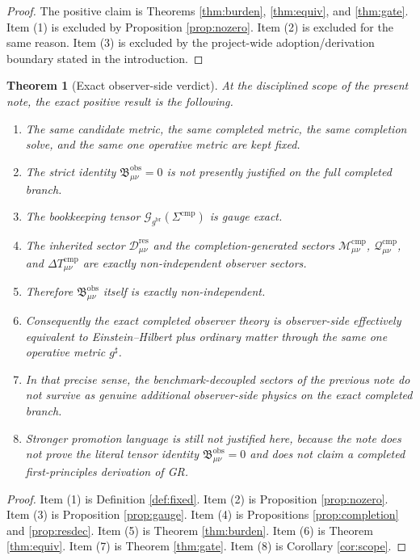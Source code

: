 \documentclass[11pt]{article}
\newcommand{\ObserverMetric}{g^{\mathrm{br}}}
\newcommand{\CompletedMetric}{g^{\sharp}}
\newcommand{\CompShift}{\Sigma^{\mathrm{cmp}}}
\newcommand{\ResidualDec}{\mathcal D_{\mu\nu}^{\mathrm{res}}}
\newcommand{\GaugeBook}{\mathcal G_{\ObserverMetric}}
\newcommand{\CompMix}{\mathcal M_{\mu\nu}^{\mathrm{cmp}}}
\newcommand{\CompQuad}{\mathcal Q_{\mu\nu}^{\mathrm{cmp}}}
\newcommand{\DeltaTComp}{\Delta T_{\mu\nu}^{\mathrm{cmp}}}
\newcommand{\ObsBurden}{\mathfrak B_{\mu\nu}^{\mathrm{obs}}}
\newtheorem{theorem}{Theorem}
\begin{document}
\begin{proof}
The positive claim is Theorems \ref{thm:burden}, \ref{thm:equiv}, and \ref{thm:gate}. Item (1) is excluded by Proposition \ref{prop:nozero}. Item (2) is excluded for the same reason. Item (3) is excluded by the project-wide adoption/derivation boundary stated in the introduction.
\end{proof}

\begin{theorem}[Exact observer-side verdict]
\label{thm:verdict}
At the disciplined scope of the present note, the exact positive result is the following.
\begin{enumerate}
    \item The same candidate metric, the same completed metric, the same completion solve, and the same one operative metric are kept fixed.
    \item The strict identity \(\ObsBurden=0\) is not presently justified on the full completed branch.
    \item The bookkeeping tensor \(\GaugeBook(\CompShift)\) is gauge exact.
    \item The inherited sector \(\ResidualDec\) and the completion-generated sectors \(\CompMix\), \(\CompQuad\), and \(\DeltaTComp\) are exactly non-independent observer sectors.
    \item Therefore \(\ObsBurden\) itself is exactly non-independent.
    \item Consequently the exact completed observer theory is observer-side effectively equivalent to Einstein--Hilbert plus ordinary matter through the same one operative metric \(\CompletedMetric\).
    \item In that precise sense, the benchmark-decoupled sectors of the previous note do not survive as genuine additional observer-side physics on the exact completed branch.
    \item Stronger promotion language is still not justified here, because the note does not prove the literal tensor identity \(\ObsBurden=0\) and does not claim a completed first-principles derivation of GR.
\end{enumerate}
\end{theorem}

\begin{proof}
Item (1) is Definition \ref{def:fixed}. Item (2) is Proposition \ref{prop:nozero}. Item (3) is Proposition \ref{prop:gauge}. Item (4) is Propositions \ref{prop:completion} and \ref{prop:resdec}. Item (5) is Theorem \ref{thm:burden}. Item (6) is Theorem \ref{thm:equiv}. Item (7) is Theorem \ref{thm:gate}. Item (8) is Corollary \ref{cor:scope}.
\end{proof}
\end{document}
